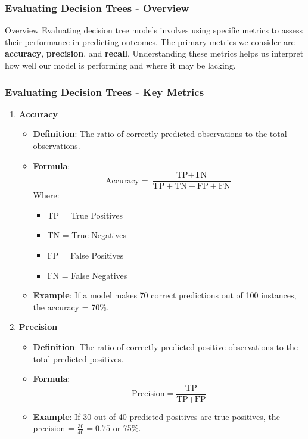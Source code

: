 \documentclass[aspectratio=169]{beamer}
\begin{document}
\begin{frame}[fragile]
    \frametitle{Evaluating Decision Trees - Overview}
    \begin{block}{Overview}
        Evaluating decision tree models involves using specific metrics to assess their performance in predicting outcomes. 
        The primary metrics we consider are \textbf{accuracy}, \textbf{precision}, and \textbf{recall}. 
        Understanding these metrics helps us interpret how well our model is performing and where it may be lacking.
    \end{block}
\end{frame}

\begin{frame}[fragile]
    \frametitle{Evaluating Decision Trees - Key Metrics}
    \begin{enumerate}
        \item \textbf{Accuracy}
            \begin{itemize}
                \item \textbf{Definition}: The ratio of correctly predicted observations to the total observations.
                \item \textbf{Formula}:
                    \begin{equation}
                        \text{Accuracy} = \frac{\text{TP} + \text{TN}}{\text{TP} + \text{TN} + \text{FP} + \text{FN}}
                    \end{equation}
                    Where:
                    \begin{itemize}
                        \item TP = True Positives
                        \item TN = True Negatives
                        \item FP = False Positives
                        \item FN = False Negatives
                    \end{itemize}
                \item \textbf{Example}: If a model makes 70 correct predictions out of 100 instances, the accuracy = 70\%.
            \end{itemize}
        
        \item \textbf{Precision}
            \begin{itemize}
                \item \textbf{Definition}: The ratio of correctly predicted positive observations to the total predicted positives.
                \item \textbf{Formula}:
                    \begin{equation}
                        \text{Precision} = \frac{\text{TP}}{\text{TP} + \text{FP}}
                    \end{equation}
                \item \textbf{Example}: If 30 out of 40 predicted positives are true positives, the precision = \( \frac{30}{40} = 0.75 \) or 75\%.
            \end{itemize}
    \end{enumerate}
\end{frame}
\end{document}
